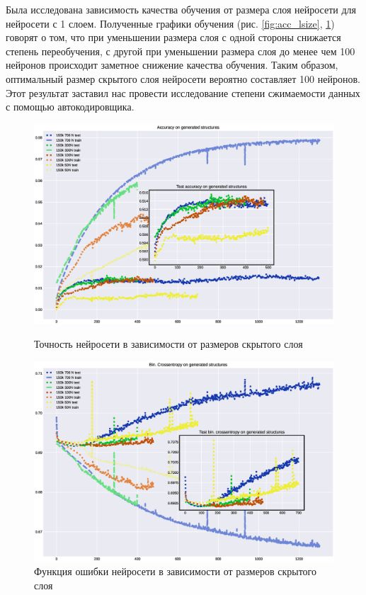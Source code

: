 \documentclass{article}
\begin{document}
Была исследована зависимость качества обучения от размера слоя нейросети для нейросети с 1 слоем. Полученные графики обучения (рис. \ref{fig:acc_lsize}, \ref{fig:loss_lsize}) говорят о том, что при уменьшении размера слоя с одной стороны снижается степень переобучения, с другой при уменьшении размера слоя до менее чем 100 нейронов происходит заметное снижение качества обучения. Таким образом, оптимальный размер скрытого слоя нейросети вероятно составляет 100 нейронов. Этот результат заставил нас провести исследование степени сжимаемости данных с помощью автокодировщика.

\begin{figure}[!h]
\includegraphics[width=\linewidth]{imgs/acc-lsize.eps}
  \caption{Точность нейросети в зависимости от размеров скрытого слоя}\label{fig:acc_lsize}
\endminipage\hfill
{}%
\includegraphics[width=\linewidth]{imgs/loss-lsize.eps}
  \caption{Функция ошибки нейросети в зависимости от размеров скрытого слоя}\label{fig:loss_lsize}
\endminipage
\end{figure}
\end{document}
